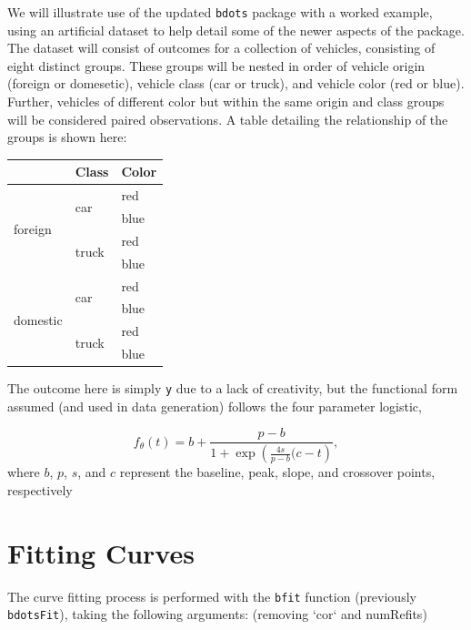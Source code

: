 \documentclass{article}
\newcommand{\xt}{\texttt}%
\begin{document}
We will illustrate use of the updated \xt{bdots} package with a worked example, using an artificial dataset to help detail some of the newer aspects of the package. The dataset will consist of outcomes for a collection of vehicles, consisting of eight distinct groups. These groups will be nested in order of vehicle origin (foreign or domesetic), vehicle class (car or truck), and vehicle color (red or blue). Further, vehicles of different color but within the same origin and class groups will be considered paired observations. A table detailing the relationship of the groups is shown here:

\begin{center}

\begin{tabular}{|p{0.9in}|p{0.9in}|p{0.9in}|} \hline 
\rowcolor{lightgray} \multicolumn{1}{|c|}{Origin} & \multicolumn{1}{c|}{Class} & \multicolumn{1}{c|}{Color}\\
\hline
\multirow{4}{*}{foreign} & \multirow{2}{*}{car} & red \\
\hhline{~~-}
& & blue \\
\hhline{~--}
& \multirow{2}{*}{truck} & red \\
\hhline{~~-}
& & blue \\
\hline
\multirow{4}{*}{domestic} & \multirow{2}{*}{car} & red \\
\hhline{~~-}
& & blue \\
\hhline{~--}
& \multirow{2}{*}{truck} & red \\
\hhline{~~-}
& & blue \\
\hline
\end{tabular}
\end{center}

The outcome here is simply \xt{y} due to a lack of creativity, but the functional form assumed (and used in data generation) follows the four parameter logistic, 

\begin{equation}
f_{\theta}(t) = b + \frac{p-b}{1 + \exp \left( \frac{4s}{p-b} (c-t \right)},
\end{equation}
where $b$, $p$, $s$, and $c$ represent the baseline, peak, slope, and crossover points, respectively


\section{Fitting Curves}

The curve fitting process is performed with the \texttt{bfit} function (previously \texttt{bdotsFit}), taking the following arguments: (removing `cor` and numRefits)
\end{document}
